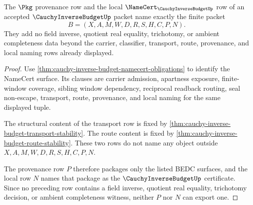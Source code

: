\begin{theorem}
\label{thm:cauchy-inverse-budget-provenance-local-naming}
The $\Pkg$ provenance row and the local $\NameCert_{\CauchyInverseBudgetUp}$ row of an accepted $\CauchyInverseBudgetUp$ packet name exactly the finite packet
$$
B=(X,A,M,W,D,R,S,H,C,P,N).
$$
They add no field inverse, quotient real equality, trichotomy, or ambient completeness data beyond the carrier, classifier, transport, route, provenance, and local naming rows already displayed.
\end{theorem}
\begin{proof}
Use \autoref{thm:cauchy-inverse-budget-namecert-obligations} to identify the NameCert surface. Its clauses are carrier admission, apartness exposure, finite-window coverage, sibling window dependency, reciprocal readback routing, seal non-escape, transport, route, provenance, and local naming for the same displayed tuple.

The structural content of the transport row is fixed by \autoref{thm:cauchy-inverse-budget-transport-stability}. The route content is fixed by \autoref{thm:cauchy-inverse-budget-route-stability}. These two rows do not name any object outside $X,A,M,W,D,R,S,H,C,P,N$.

The provenance row $P$ therefore packages only the listed BEDC surfaces, and the local row $N$ names that package as the $\CauchyInverseBudgetUp$ certificate. Since no preceding row contains a field inverse, quotient real equality, trichotomy decision, or ambient completeness witness, neither $P$ nor $N$ can export one.
\end{proof}

